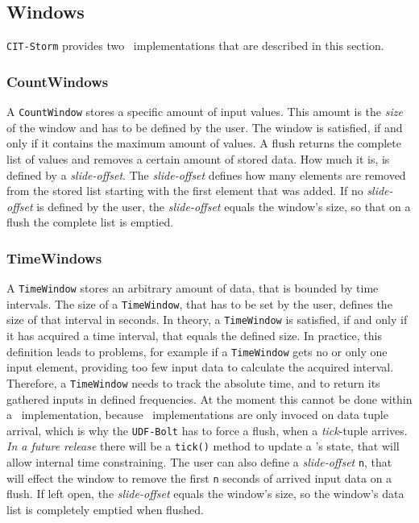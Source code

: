 \subsection{Windows}
\label{sect:windows}
\texttt{CIT-Storm} provides two \iwindow\ implementations that are described in this section.

\subsubsection{CountWindows}
A \texttt{CountWindow} stores a specific amount of input values. This amount is the \textsl{size} of the window and has to be defined by the user. The window is satisfied, if and only if it contains the maximum amount of values. A flush returns the complete list of values and removes a certain amount of stored data. How much it is, is defined by a \textsl{slide-offset}. The \textsl{slide-offset} defines how many elements are removed from the stored list starting with the first element that was added. If no \textsl{slide-offset} is defined by the user, the \textsl{slide-offset} equals the window's size, so that on a flush the complete list is emptied.

\subsubsection{TimeWindows}
\label{sect:Timewindow}

A \texttt{TimeWindow} stores an arbitrary amount of data, that is bounded by time intervals. The size of a  \texttt{TimeWindow}, that has to be set by the user, defines the size of that interval in seconds. In theory, a \texttt{TimeWindow} is satisfied, if and only if it has acquired a time interval, that equals the defined size. In practice, this definition leads to problems, for example if a \texttt{TimeWindow} gets no or only one input element, providing too few input data to calculate the acquired interval. Therefore, a \texttt{TimeWindow} needs to track the absolute time, and to return its gathered inputs in defined frequencies. At the moment this cannot be done within a \iwindow\ implementation, because \iwindow\ implementations are only invoced on data tuple arrival, which is why the \texttt{UDF-Bolt} has to force a flush, when a \textsl{tick}-tuple arrives. \textsl{In a future release} there will be a \texttt{tick()} method to update a \iwindow's state, that will allow internal time constraining. The user can also define a \textsl{slide-offset} \texttt{n}, that will effect the window to remove the first \texttt{n} seconds of arrived input data on a flush. If left open, the \textsl{slide-offset} equals the window's size, so the window's data list is completely emptied when flushed.